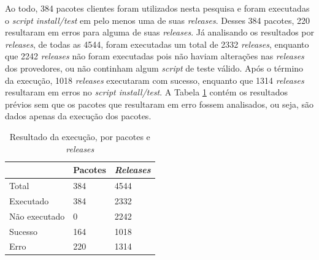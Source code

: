 

Ao todo, 384 pacotes clientes foram utilizados nesta pesquisa e foram executadas o \textit{script install/test} em pelo menos uma de suas \textit{releases}. Desses 384 pacotes, 220 resultaram em erros para alguma de suas \textit{releases}. Já analisando os resultados por \textit{releases}, de todas as 4544, foram executadas um total de 2332 \textit{releases}, enquanto que 2242 \textit{releases} não foram executadas pois não haviam alterações nas \textit{releases} dos provedores, ou não continham algum \textit{script} de teste válido. Após o término da execução, 1018 \textit{releases} executaram com sucesso, enquanto que 1314 \textit{releases} resultaram em erros no \textit{script install/test}. A Tabela \ref{tab:res_rq1_1} contém os resultados prévios sem que os pacotes que resultaram em erro fossem analisados, ou seja, são dados apenas da execução dos pacotes.

\begin{table}[]
\centering
\begin{tabular}{|l|l|l|}
\hline
                    & Pacotes & \textit{Releases} \\ \hline
    Total           & 384     & 4544     \\
    Executado       & 384     & 2332     \\
    Não executado   & 0       & 2242     \\
    Sucesso         & 164     & 1018     \\
    Erro            & 220     & 1314     \\ \hline
\end{tabular}
\caption{Resultado da execução, por pacotes e \textit{releases}}
\label{tab:res_rq1_1}
\end{table}

